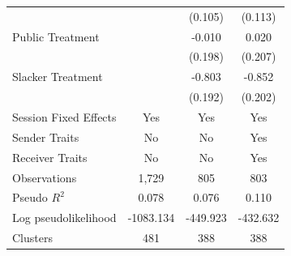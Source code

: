 \begin{tabular}{lccc}
                &                  &  (0.105)         &  (0.113)         \\
Public Treatment&                  &   -0.010         &    0.020         \\
                &                  &  (0.198)         &  (0.207)         \\
Slacker Treatment&                  &   -0.803\sym{***}&   -0.852\sym{***}\\
                &                  &  (0.192)         &  (0.202)         \\
Session Fixed Effects &      Yes         &      Yes         &      Yes         \\
Sender Traits   &       No         &       No         &      Yes         \\
Receiver Traits &       No         &       No         &      Yes         \\
\midrule
Observations    &    1,729         &      805         &      803         \\
Pseudo $R^2$    &    0.078         &    0.076         &    0.110         \\
Log pseudolikelihood&-1083.134         & -449.923         & -432.632         \\
Clusters        &      481         &      388         &      388         \\
\bottomrule
\end{tabular}
